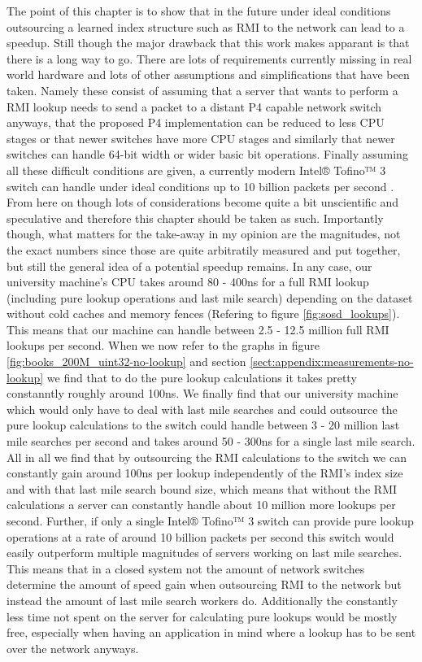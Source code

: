 The point of this chapter is to show that in the future under ideal conditions outsourcing a learned index structure such as RMI to the network can lead to a speedup. Still though the major drawback that this work makes apparant is that there is a long way to go. There are lots of requirements currently missing in real world hardware and lots of other assumptions and simplifications that have been taken. Namely these consist of assuming that a server that wants to perform a RMI lookup needs to send a packet to a distant P4 capable network switch anyways, that the proposed P4 implementation can be reduced to less CPU stages or that newer switches have more CPU stages and similarly that newer switches can handle 64-bit width or wider basic bit operations. Finally assuming all these difficult conditions are given, a currently modern Intel® Tofino™ 3 switch can handle under ideal conditions up to 10 billion packets per second \cite{tofino3-brief}. From here on though lots of considerations become quite a bit unscientific and speculative and therefore this chapter should be taken as such. Importantly though, what matters for the take-away in my opinion are the magnitudes, not the exact numbers since those are quite arbitratily measured and put together, but still the general idea of a potential speedup remains. In any case, our university machine's CPU takes around 80 - 400ns for a full RMI lookup (including pure lookup operations and last mile search) depending on the dataset without cold caches and memory fences (Refering to figure \ref{fig:sosd_lookups}). This means that our machine can handle between 2.5 - 12.5 million full RMI lookups per second. When we now refer to the graphs in figure \ref{fig:books_200M_uint32-no-lookup} and section \ref{sect:appendix:measurements-no-lookup} we find that to do the pure lookup calculations it takes pretty constanntly roughly around 100ns. We finally find that our university machine which would only have to deal with last mile searches and could outsource the pure lookup calculations to the switch could handle between 3 - 20 million last mile searches per second and takes around 50 - 300ns for a single last mile search. All in all we find that by outsourcing the RMI calculations to the switch we can constantly gain around 100ns per lookup independently of the RMI's index size and with that last mile search bound size, which means that without the RMI calculations a server can constantly handle about 10 million more lookups per second. Further, if only a single Intel® Tofino™ 3 switch can provide pure lookup operations at a rate of around 10 billion packets per second this switch would easily outperform multiple magnitudes of servers working on last mile searches. This means that in a closed system not the amount of network switches determine the amount of speed gain when outsourcing RMI to the network but instead the amount of last mile search workers do. Additionally the constantly less time not spent on the server for calculating pure lookups would be mostly free, especially when having an application in mind where a lookup has to be sent over the network anyways.
